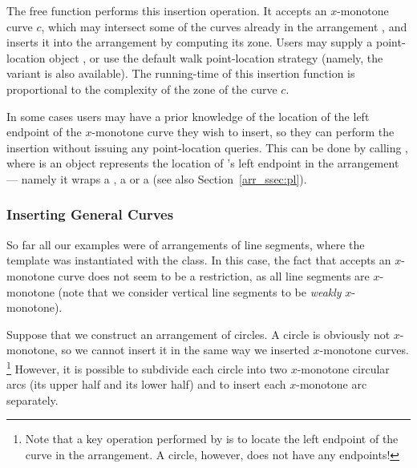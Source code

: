 The free function  performs
this insertion operation. It accepts an $x$-monotone curve $c$,
which may intersect some of the curves already in the arrangement
, and inserts it into the arrangement by computing its zone.
Users may supply a point-location object , or use the default
walk point-location strategy (namely, the variant
 is also available). The
running-time of this insertion function is proportional to the
complexity of the zone of the curve $c$.

\begin{ccAdvanced}
In some cases users may have a prior knowledge of the location of the
left endpoint of the $x$-monotone curve  they wish to insert,
so they can perform the insertion without issuing any point-location
queries. This can be done by calling
, where  is an
object represents the location of 's left endpoint in the
arrangement --- namely it wraps a , a
 or a  (see
also Section~\ref{arr_ssec:pl}).
\end{ccAdvanced}

\subsubsection{Inserting General Curves\label{arr_sssec:insert_gen}}

So far all our examples were of arrangements of line segments,
where the  template was instantiated with the
 class. In this case, the fact that
 accepts an $x$-monotone curve does not
seem to be a restriction, as all line segments are $x$-monotone
(note that we consider vertical line segments to be {\em weakly}
$x$-monotone).

Suppose that we construct an arrangement of circles. A circle is
obviously not $x$-monotone, so we cannot insert it in the same way we
inserted $x$-monotone curves. \footnote{Note that a key
operation performed by  is to locate the
left endpoint of the curve in the arrangement. A circle, however, does
not have any endpoints!} However, it is possible to subdivide each circle
into two $x$-monotone circular arcs (its upper half and its lower
half) and to insert each $x$-monotone arc separately.

